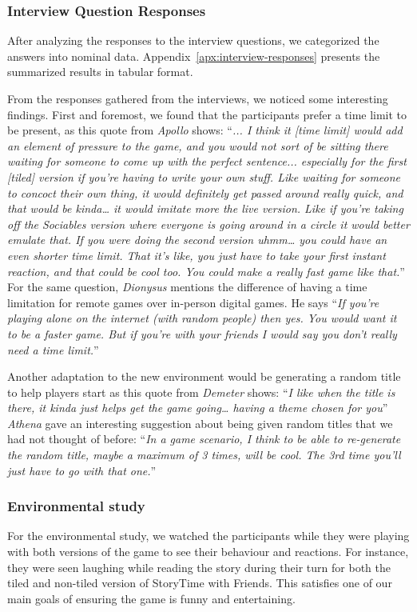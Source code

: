 \documentclass{sigchi}
\begin{document}
\subsubsection{Interview Question Responses}
After analyzing the responses to the interview questions, we categorized the answers into nominal data. Appendix~\ref{apx:interview-responses} presents the summarized results in tabular format. 

From the responses gathered from the interviews, we noticed some interesting findings. First and foremost, we found that the participants prefer a time limit to be present, as this quote from \textit{Apollo} shows: \thinspace \thinspace
``\textit{... I think it [time limit] would add an element of pressure to the game, and you would not sort of be sitting there waiting for someone to come up with the perfect sentence... especially for the first [tiled] version if you're having to write your own stuff. Like waiting for someone to concoct their own thing, it would definitely get passed around really quick, and that would be kinda… it would imitate more the live version. Like if you're taking off the Sociables version where everyone is going around in a circle it would better emulate that. If you were doing the second version uhmm… you could have an even shorter time limit. That it's like, you just have to take your first instant reaction, and that could be cool too. You could make a really fast game like that.}'' \thinspace \thinspace  For the same question, \textit{Dionysus} mentions the difference of having a time limitation for remote games over in-person digital games. He says \thinspace \thinspace ``\textit{If you're playing alone on the internet (with random people) then yes. You would want it to be a faster game. But if you're with your friends I would say you don't really need a time limit.}'' \thinspace \thinspace

Another adaptation to the new environment would be generating a random title to help players start as this quote from \textit{Demeter} shows: ``\textit{I like when the title is there, it kinda just helps get the game going… having a theme chosen for you}'' \thinspace \thinspace \textit{Athena} gave an interesting suggestion about being given random titles that we had not thought of before: ``\textit{In a game scenario, I think to be able to re-generate the random title, maybe a maximum of 3 times, will be cool. The 3rd time you'll just have to go with that one.}'' \thinspace \thinspace

\subsubsection{Environmental study}
For the environmental study, we watched the participants while they were playing with both versions of the game to see their behaviour and reactions. For instance, they were seen laughing while reading the story during their turn for both the tiled and non-tiled version of StoryTime with Friends. This satisfies one of our main goals of ensuring the game is funny and entertaining. 
\end{document}
